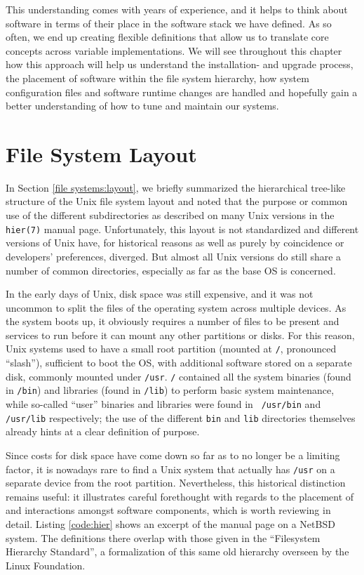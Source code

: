 This understanding comes with years of experience, and
it helps to think about software in terms of their
place in the software stack we have defined.  As so
often, we end up creating flexible definitions that
allow us to translate core concepts across variable
implementations.  We will see throughout this chapter
how this approach will help us understand the
installation- and upgrade process, the placement of
software within the file system hierarchy, how system
configuration files and software runtime changes are
handled and hopefully gain a better understanding of
how to tune and maintain our systems.

\section{File System Layout}
\label{software-installation:file-system-layout}

In Section \ref{file systems:layout}, we briefly
summarized the hierarchical tree-like structure of the
Unix file system layout and noted that the purpose or
common use of the different subdirectories as
described on many Unix versions in the {\tt hier(7)}
manual page.  Unfortunately, this layout is not
standardized and different versions of Unix have, for
historical reasons as well as purely by coincidence or
developers' preferences, diverged.  But almost all
Unix versions do still share a number of common
directories, especially as far as the base OS is
concerned.

In the early days of Unix, disk space was still
expensive, and it was not uncommon to split the files
of the operating system across multiple devices.  As
the system boots up, it obviously requires a number of
files to be present and services to run before it can
mount any other partitions or disks.  For this reason,
Unix systems used to have a small root partition
(mounted at {\tt /}, pronounced ``slash''), sufficient
to boot the OS, with additional software stored on a
separate disk, commonly mounted under {\tt /usr}.
{\tt /} contained all the system binaries (found in
{\tt /bin}) and libraries (found in {\tt /lib}) to
perform basic system maintenance, while so-called
``user'' binaries and libraries were found in {\tt
/usr/bin} and {\tt /usr/lib} respectively; the use of
the different {\tt bin} and {\tt lib} directories
themselves already hints at a clear definition of
purpose.

Since costs for disk space have come down so far as to
no longer be a limiting factor, it is nowadays rare to
find a Unix system that actually has {\tt /usr} on a
separate device from the root partition.
Nevertheless, this historical distinction remains
useful: it illustrates careful forethought with
regards to the placement of and interactions amongst
software components, which is worth reviewing in
detail.  Listing \ref{code:hier} shows an excerpt of
the  manual page on a NetBSD system.  The
definitions there overlap with those given in the
``Filesystem Hierarchy Standard''\cite{fhs}, a formalization of this
same old hierarchy overseen by the Linux
Foundation.

